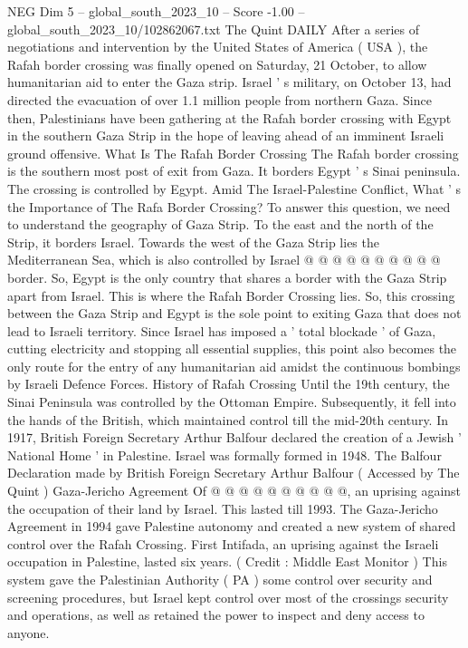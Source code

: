 \begin{textsample}{NEG Dim 5 – global\_south\_2023\_10 – Score -1.00 – global\_south\_2023\_10/102862067.txt}  \label{ex:f5_neg_092}
The Quint DAILY After a series of negotiations and intervention by the United States of America ( USA ), the Rafah border crossing was finally opened on Saturday, 21 October, to allow humanitarian aid to enter the Gaza strip.
Israel ' s military, on October 13, had directed the evacuation of over 1.1 million people from northern Gaza.
Since then, Palestinians have been gathering at the Rafah border crossing with Egypt in the southern Gaza Strip in the hope of leaving ahead of an imminent Israeli ground offensive.
What Is The Rafah Border Crossing The Rafah border crossing is the southern most post of exit from Gaza.
It borders Egypt ' s Sinai peninsula.
The crossing is controlled by Egypt.
Amid The Israel-Palestine Conflict, What ' s the Importance of The Rafa Border Crossing?
To answer this question, we need to understand the geography of Gaza Strip.
To the east and the north of the Strip, it borders Israel.
Towards the west of the Gaza Strip lies the Mediterranean Sea, which is also controlled by Israel @ @ @ @ @ @ @ @ @ @ border.
So, Egypt is the only country that shares a border with the Gaza Strip apart from Israel.
This is where the Rafah Border Crossing lies.
So, this crossing between the Gaza Strip and Egypt is the sole point to exiting Gaza that does not lead to Israeli territory.
Since Israel has imposed a ' total blockade ' of Gaza, cutting electricity and stopping all essential supplies, this point also becomes the only route for the entry of any humanitarian aid amidst the continuous bombings by Israeli Defence Forces.
History of Rafah Crossing Until the 19th century, the Sinai Peninsula was controlled by the Ottoman Empire.
Subsequently, it fell into the hands of the British, which maintained control till the mid-20th century.
In 1917, British Foreign Secretary Arthur Balfour declared the creation of a Jewish ' National Home ' in Palestine.
Israel was formally formed in 1948.
The Balfour Declaration made by British Foreign Secretary Arthur Balfour ( Accessed by The Quint ) Gaza-Jericho Agreement Of @ @ @ @ @ @ @ @ @ @, an uprising against the occupation of their land by Israel.
This lasted till 1993.
The Gaza-Jericho Agreement in 1994 gave Palestine autonomy and created a new system of shared control over the Rafah Crossing.
First Intifada, an uprising against the Israeli occupation in Palestine, lasted six years. ( Credit : Middle East Monitor ) This system gave the Palestinian Authority ( PA ) some control over security and screening procedures, but Israel kept control over most of the crossings security and operations, as well as retained the power to inspect and deny access to anyone.

\end{textsample}
